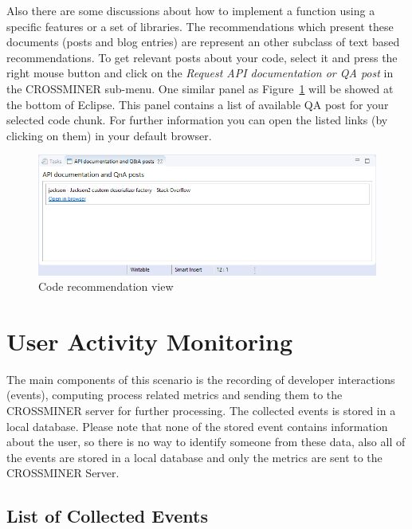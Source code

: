 \documentclass[11pt,a4paper]{book}
\begin{document}
Also there are some discussions about how to implement a function using a specific features or a set of libraries. The recommendations which present these documents (posts and blog entries) are represent an other subclass of text based recommendations. To get relevant posts about your code, select it and press the right mouse button and click on the \textit{Request API documentation or QA post} in the CROSSMINER sub-menu. One similar panel as Figure~\ref{fig:apidocumentation} will be showed at the bottom of Eclipse. This panel contains a list of available QA post for your selected code chunk. For further information you can open the listed links (by clicking on them) in your default browser.

\begin{figure}[h]
	\centering
	\includegraphics[width=\linewidth]{pic/apidocumentation.png}
	\caption{Code recommendation view}
	\label{fig:apidocumentation}
\end{figure}

\chapter{User Activity Monitoring}

The main components of this scenario is the recording of developer interactions (events), computing process related metrics and sending them to the CROSSMINER server for further processing. The collected events is stored in a local database. Please note that none of the stored event contains information about the user, so there is no way to identify someone from these data, also all of the events are stored in a local database and only the metrics are sent to the CROSSMINER Server.

\section{List of Collected Events}
\end{document}
